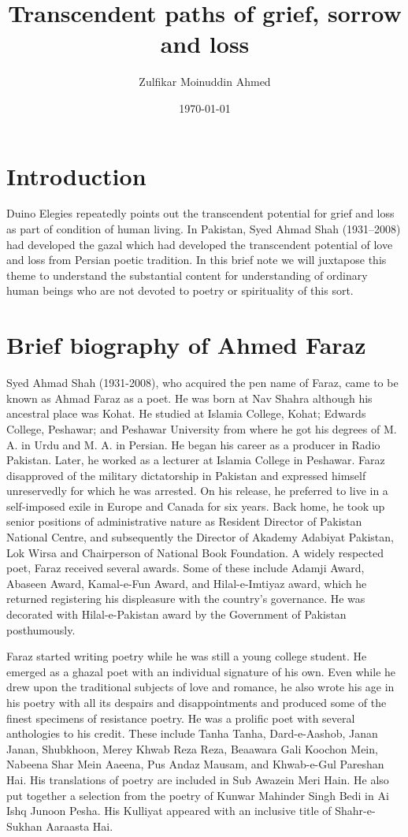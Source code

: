 \documentclass{amsart}
\title{Transcendent paths of grief, sorrow and loss}
\author{Zulfikar Moinuddin Ahmed}
\date{\today}
\begin{document}
\maketitle

\section{Introduction}

Duino Elegies repeatedly points out the transcendent potential for grief and loss as part of condition of human living.  In Pakistan, Syed Ahmad Shah (1931--2008) had developed the gazal which had developed the transcendent potential of love and loss from Persian poetic tradition.  In this brief note we will juxtapose this theme to understand the substantial content for understanding of ordinary human beings who are not devoted to poetry or spirituality of this sort.


\section{Brief biography of Ahmed Faraz}

Syed Ahmad Shah (1931-2008), who acquired the pen name of Faraz, came to be known as Ahmad Faraz as a poet. He was born at Nav Shahra although his ancestral place was Kohat. He studied at Islamia College, Kohat; Edwards College, Peshawar; and Peshawar University from where he got his degrees of M. A. in Urdu and M. A. in Persian. He began his career as a producer in Radio Pakistan. Later, he worked as a lecturer at Islamia College in Peshawar. Faraz disapproved of the military dictatorship in Pakistan and expressed himself unreservedly for which he was arrested. On his release, he preferred to live in a self-imposed exile in Europe and Canada for six years. Back home, he took up senior positions of administrative nature as Resident Director of Pakistan National Centre, and subsequently the Director of Akademy Adabiyat Pakistan, Lok Wirsa and Chairperson of National Book Foundation. A widely respected poet, Faraz received several awards. Some of these include Adamji Award, Abaseen Award, Kamal-e-Fun Award, and Hilal-e-Imtiyaz award, which he returned registering his displeasure with the country’s governance. He was decorated with Hilal-e-Pakistan award by the Government of Pakistan posthumously.  

Faraz started writing poetry while he was still a young college student. He emerged as a ghazal poet with an individual signature of his own. Even while he drew upon the traditional subjects of love and romance, he also wrote his age in his poetry with all its despairs and disappointments and produced some of the finest specimens of resistance poetry.  He was a prolific poet with several anthologies to his credit. These include Tanha Tanha, Dard-e-Aashob, Janan Janan, Shubkhoon, Merey Khwab Reza Reza, Beaawara Gali Koochon Mein, Nabeena Shar Mein Aaeena, Pus Andaz Mausam,  and Khwab-e-Gul Pareshan Hai. His translations of poetry are included in Sub Awazein Meri Hain. He also put together a selection from the poetry of Kunwar Mahinder Singh Bedi in Ai Ishq Junoon Pesha. His Kulliyat appeared with an inclusive title of Shahr-e-Sukhan Aaraasta Hai.
\end{document}

